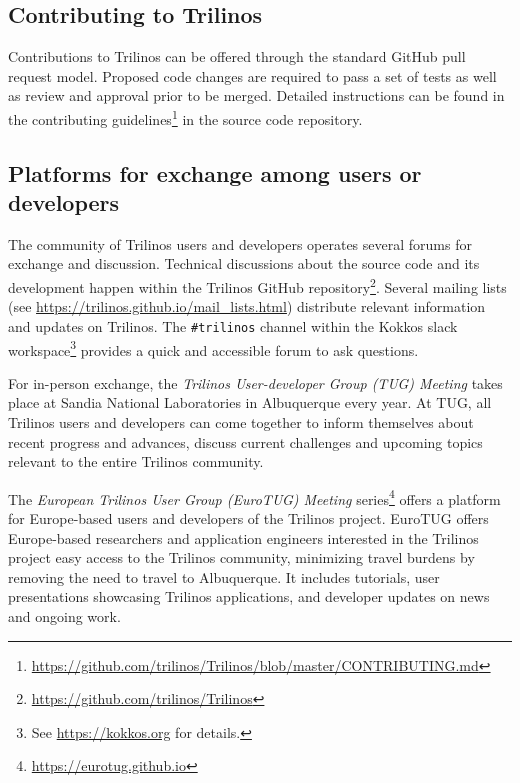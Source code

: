 
\subsection{Contributing to Trilinos}

Contributions to Trilinos can be offered through the standard GitHub pull request model. Proposed code changes are required to pass a set of tests as well as review and approval prior to be merged. Detailed instructions can be found in the contributing guidelines\footnote{\url{https://github.com/trilinos/Trilinos/blob/master/CONTRIBUTING.md}} in the source code repository.

\subsection{Platforms for exchange among users or developers}

The community of Trilinos users and developers operates several forums for exchange and discussion.
Technical discussions about the source code and its development happen within the Trilinos GitHub repository\footnote{\url{https://github.com/trilinos/Trilinos}}.
Several mailing lists (see \url{https://trilinos.github.io/mail_lists.html}) distribute relevant information and updates on Trilinos.
The \texttt{\#trilinos} channel within the Kokkos slack workspace\footnote{See \url{https://kokkos.org} for details.} provides a quick and accessible forum to ask questions.

For in-person exchange, the \emph{Trilinos User-developer Group (TUG) Meeting} takes place at Sandia National Laboratories in Albuquerque every year. At TUG, all Trilinos users and developers can come together to inform themselves about recent progress and advances,
discuss current challenges and upcoming topics relevant to the entire Trilinos community.

The \emph{European Trilinos User Group (EuroTUG) Meeting} series\footnote{\url{https://eurotug.github.io}}
offers a platform for Europe-based users and developers of the Trilinos project.
EuroTUG offers Europe-based researchers and application engineers interested in the Trilinos project easy access to the Trilinos community, minimizing travel burdens by removing the need to travel to Albuquerque.
It includes tutorials, user presentations showcasing Trilinos applications, and developer updates on news and ongoing work.

